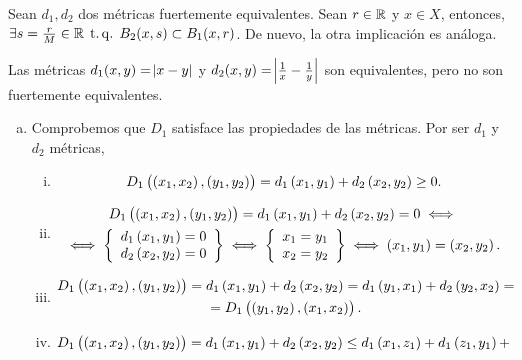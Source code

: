 \begin{ej}
	Sean $d_1, d_2$ dos m\'etricas fuertemente equivalentes. Sean $r \in \mathbb{R}$ y $x \in X$, entonces, $\exists s = \frac{r}{M} \in \mathbb{R} \operatorname{\;t.q.\;} B_2(x, s) \subset B_1(x, r)$.
	De nuevo, la otra implicación es análoga.

	Las m\'etricas $d_1(x,y) = \abs{x-y}$ y $d_2(x,y) = \abs{\frac{1}{x} - \frac{1}{y}}$ son equivalentes, pero no son fuertemente equivalentes.
\end{ej}

\begin{ej}
	\begin{enumerate}[(a)]
		\item Comprobemos que $D_1$ satisface las propiedades de las métricas. Por ser $d_1$ y $d_2$ métricas,
		\begin{enumerate}[i)]
            \item 
            \[
                D_1 \left( \left( x_1, x_2 \right) , \left( y_1 , y_2 \right) \right) = d_1 \left( x_1, y_1\right) + d_2 \left( x_2 , y_2 \right) \geq 0.
            \]
            \item 
            \begin{gather*}
                D_1 \left( \left( x_1, x_2 \right) , \left( y_1 , y_2 \right) \right) = d_1 \left( x_1, y_1\right) + d_2 \left( x_2 , y_2 \right) = 0 \iff \\
                \iff \left\{ \begin{array}{c}
                    d_1 \left( x_1, y_1 \right) = 0 \\
                    d_2 \left( x_2, y_2 \right) = 0
                \end{array} \right\} \iff \left\{ \begin{array}{c}
                    x_1=y_1 \\
                    x_2=y_2
                \end{array} \right\} \iff \left( x_1, y_1 \right) = \left( x_2, y_2 \right).
            \end{gather*}
            \item 
            \begin{gather*}
                D_1 \left( \left( x_1, x_2 \right) , \left( y_1 , y_2 \right) \right) = d_1 \left( x_1, y_1 \right) + d_2 \left( x_2 , y_2 \right) = d_1 \left( y_1, x_1 \right) + d_2 \left( y_2 , x_2 \right)= \\
                =D_1 \left( \left( y_1, y_2 \right) , \left( x_1 , x_2 \right) \right) .
            \end{gather*}
            \item 
            \begin{gather*}
                D_1 \lp \lp x_1, x_2 \rp , \lp y_1 , y_2 \rp \rp = d_1 \lp x_1, y_1 \rp + d_2 \lp x_2 , y_2 \rp \leq d_1 \lp x_1, z_1 \rp + d_1 \lp z_1, y_1 \rp + \\

\end{gather*}
\end{enumerate}
\end{enumerate}
\end{ej}
